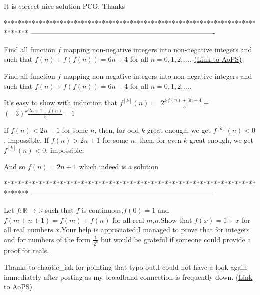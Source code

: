 \begin{solution}

It is correct nice solution PCO. Thanks
\end{solution}
*******************************************************************************
-------------------------------------------------------------------------------

\begin{problem}
	Find all function $f$ mapping non-negative integers into non-negative integers and
such that $f(n)+f(f(n))=6n+4$ for all $n=0 , 1 , 2 , ...$.
	\flushright \href{https://artofproblemsolving.com/community/c6h464775}{(Link to AoPS)}
\end{problem}



\begin{solution}
	\begin{tcolorbox}Find all function $f$ mapping non-negative integers into non-negative integers and
such that $f(n)+f(f(n))=6n+4$ for all $n=0 , 1 , 2 , ...$.\end{tcolorbox}
It's easy to show with induction that $f^{[k]}(n)=$ $2^k\frac{f(n)+3n+4}5+$ $(-3)^k\frac{2n+1-f(n)}5-1$

If $f(n)<2n+1$ for some $n$, then, for odd $k$ great enough, we get $f^{[k]}(n)<0$, impossible.
If $f(n)>2n+1$ for some $n$, then, for even $k$ great enough, we get $f^{[k]}(n)<0$, impossible.

And so $\boxed{f(n)=2n+1}$ which indeed is a solution
\end{solution}
*******************************************************************************
-------------------------------------------------------------------------------

\begin{problem}
	Let $f:\mathbb{R} \to \mathbb{R}$ such that $f$ is continuous,$f(0)=1$ and $f(m+n+1)=f(m)+f(n)$ for all real $m$,$n$.Show that $f(x)=1+x$ for all real numbers $x$.Your help is appreciated;I managed to prove that for integers and for numbers of the form $\frac{1}{2^k}$ but would be grateful if someone could provide a proof for reals.

Thanks to chaotic_iak for pointing that typo out.I could not have a look again immediately after posting as my broadband connection is frequently down.
	\flushright \href{https://artofproblemsolving.com/community/c6h464832}{(Link to AoPS)}
\end{problem}



